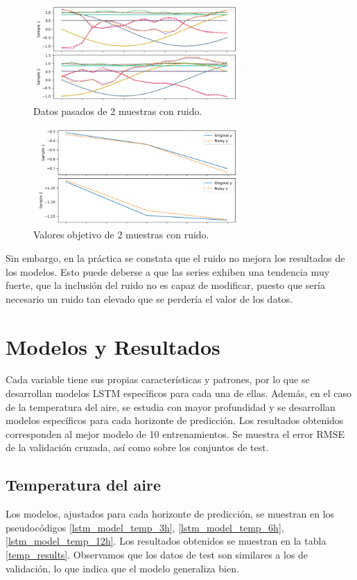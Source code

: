 \begin{figure}[H]
    \centering
    \includegraphics[width=0.7\textwidth]{images/noise_past_data.png}
    \caption{Datos pasados de 2 muestras con ruido.}
    \label{noise1}
\end{figure}

\begin{figure}[H]
    \centering
    \includegraphics[width=0.7\textwidth]{images/noise_y.png}
    \caption{Valores objetivo de 2 muestras con ruido.}
    \label{noise2}
\end{figure}

Sin embargo, en la práctica se constata que el ruido no mejora los resultados de los modelos. Esto puede deberse a que las series exhiben una tendencia muy fuerte, 
que la inclusión del ruido no es capaz de modificar, puesto que sería necesario un ruido tan elevado que se perdería el valor de los datos.

\section{Modelos y Resultados}
\label{sec:resultados}
Cada variable tiene sus propias características y patrones, por lo que se desarrollan modelos LSTM específicos para cada una de ellas. 
Además, en el caso de la temperatura del aire, se estudia con mayor profundidad y se desarrollan modelos específicos para cada horizonte de predicción.
Los resultados obtenidos corresponden al mejor modelo de 10 entrenamientos. Se muestra el error RMSE de la validación cruzada, así como sobre los conjuntos de test.

\subsection{Temperatura del aire}
Los modelos, ajustados para cada horizonte de predicción, se muestran en los pseudocódigos \ref{lstm_model_temp_3h}, \ref{lstm_model_temp_6h}, \ref{lstm_model_temp_12h}.
Los resultados obtenidos se muestran en la tabla \ref{temp_results}. Observamos que los datos de test son similares a los de validación, 
lo que indica que el modelo generaliza bien.

